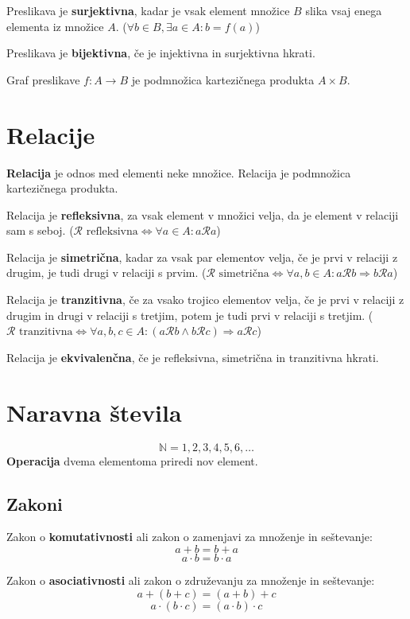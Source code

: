 \documentclass[a4paper,oneside,12pt,fleqn]{article}
\def\N{\ensuremath{\mathbb N}}
\newcommand\krat\cdot
\newcommand{\Rel}{\mathcal{R}}
\renewcommand\implies\Rightarrow
\renewcommand\iff\Leftrightarrow
\numberwithin{equation}{section}
\begin{document}
Preslikava je \textbf{surjektivna}, kadar je vsak element množice $B$ slika vsaj enega elementa iz
množice $A$. ($\forall b \in B, \exists a \in A\!: b = f(a)$)

Preslikava je \textbf{bijektivna}, če je injektivna in surjektivna hkrati.

Graf preslikave $f\!\!: A \rightarrow B$ je podmnožica kartezičnega produkta $A \times B$.

\section{Relacije}
\label{sec:relacije}
\textbf{Relacija} je odnos med elementi neke množice.
Relacija je podmnožica kartezičnega produkta.

Relacija je \textbf{refleksivna}, za vsak element v množici velja, da je element v relaciji sam s
seboj. ($\Rel \text{ refleksivna} \iff \forall a \in A\!: a \Rel a$)

Relacija je \textbf{simetrična}, kadar za vsak par elementov velja, če je prvi v relaciji z drugim,
je tudi drugi v relaciji s prvim. 
($\Rel \text{ simetrična} \iff \forall a, b \in A\!: a \Rel b \implies b \Rel a$)

Relacija je \textbf{tranzitivna}, če za vsako trojico elementov velja, če je prvi v relaciji z
drugim in drugi v relaciji s tretjim, potem je tudi prvi v relaciji s tretjim.
($\Rel \text{ tranzitivna} \iff \forall a, b, c \in A\!: (a \Rel b \land b \Rel c) \implies a \Rel c$)

Relacija je \textbf{ekvivalenčna}, če je refleksivna, simetrična in tranzitivna hkrati.

\section{Naravna števila}
\label{sec:naravna}
\[ \N = {1, 2, 3, 4, 5, 6, \ldots} \]
\textbf{Operacija} dvema elementoma priredi nov element.

\subsection{Zakoni}
\label{sec:naravna:zakoni}
Zakon o \textbf{komutativnosti} ali zakon o zamenjavi za množenje in seštevanje:
\[ a + b =  b + a \]
\[ a \krat b =  b \krat a \]

Zakon o \textbf{asociativnosti} ali zakon o združevanju za množenje in seštevanje:
\[ a + (b + c) = (a + b) + c \]
\[ a \krat (b \krat c) = (a \krat b) \krat c \]
\end{document}
